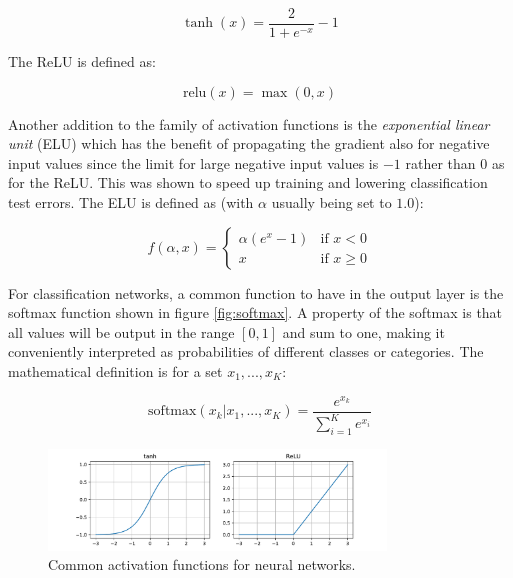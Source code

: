 \begin{equation}
    \tanh(x) = \frac{2}{1+e^{-x}} - 1
\end{equation}

The ReLU is defined as:

\begin{equation}
    \text{relu}(x) = \max (0, x)
\end{equation}

Another addition to the family of activation functions is the
\textit{exponential linear unit} (ELU) \cite{clevert2015fast} which has the
benefit of propagating the gradient also for negative input values since the
limit for large negative input values is $-1$ rather than $0$ as for the ReLU.
This was shown to speed up training and lowering classification test errors.
The ELU is defined as (with $\alpha$ usually being set to $1.0$):

\begin{equation}
    f(\alpha, x) =
    \begin{cases}
        \alpha (e^{x} - 1) & \text{if } x < 0 \\
        x & \text{if } x \geq 0
    \end{cases}
\end{equation}

For classification networks, a common function to have in the output layer is
the softmax function shown in figure \ref{fig:softmax}. A property of the
softmax is that all values will be output in the range $[0, 1]$ and sum to one,
making it conveniently interpreted as probabilities of different classes or
categories. The mathematical definition is for a set $x_1, ..., x_K$:

\begin{equation}
    \text{softmax}(x_k|x_1, ..., x_K) = \frac{e^{x_k}}{\sum_{i=1}^K e^{x_i}}
\end{equation}

\begin{figure}[h]
    \centering
    \includegraphics[width=0.8\textwidth]{res/relu_tanh.pdf}

    \caption{Common activation functions for neural networks.}

    \label{fig:tanh_relu}
\end{figure}

